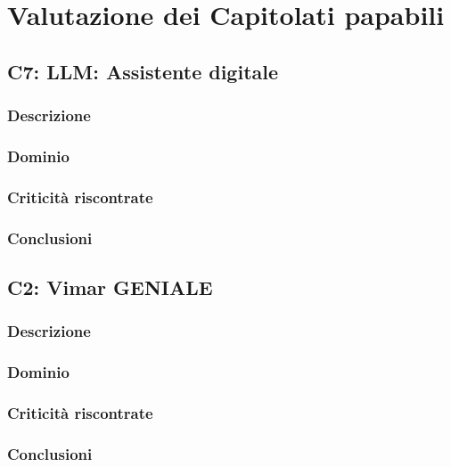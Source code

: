\section{Valutazione dei Capitolati papabili}


\subsection{C7: LLM: Assistente digitale}

\subsubsection{Descrizione}

\subsubsection{Dominio}

\subsubsection{Criticità riscontrate}

\subsubsection{Conclusioni}


\subsection{C2: Vimar GENIALE}

\subsubsection{Descrizione}

\subsubsection{Dominio}

\subsubsection{Criticità riscontrate}

\subsubsection{Conclusioni}